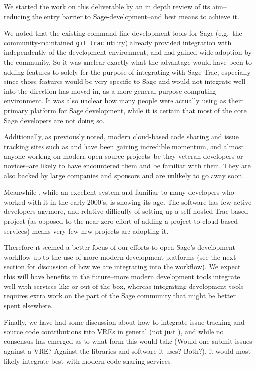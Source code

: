 We started the work on this deliverable by an in depth review of its aim--
reducing the entry barrier to Sage-development--and best means to achieve it.

We noted that the existing command-line development tools for Sage (e.g.~the
community-maintained {\tt git trac} utility) already provided integration with
\Trac independently of the development environment, and had gained wide
adoption by the community. So it was unclear exactly what the advantage would
have been to adding features to \cocalc solely for the purpose of integrating
with Sage-Trac, especially since those features would be very specific to Sage
and would not integrate well into the direction \cocalc has moved in, as a more
general-purpose computing environment.  It was also unclear how many people
were actually using \cocalc as their primary platform for Sage development,
while it is certain that most of the core Sage developers are not doing so.

Additionally, as previously noted, modern cloud-based code sharing and issue
tracking sites such as \GitHub and \GitLab have been gaining incredible
momentum, and almost anyone working on modern open source projects--be they
veteran developers or novices--are likely to have encountered them and be
familiar with them.  They are also backed by large companies and sponsors and
are unlikely to go away soon.

Meanwhile \Trac, while an excellent system and familiar to many developers who
worked with it in the early 2000's, is showing its age.  The \Trac software has
few active developers anymore, and relative difficulty of setting up a
self-hosted Trac-based project (as opposed to the near zero effort of adding a
project to cloud-based services) means very few new projects are adopting it.

Therefore it seemed a better focus of our efforts to open Sage's development
workflow up to the use of more modern development platforms (see the next
section for discussion of how we are integrating \GitLab into the workflow).
We expect this will have benefits in the future--more modern development tools
integrate well with services like \GitHub or \GitLab out-of-the-box, whereas
integrating development tools \Trac requires extra work on the part of the Sage
community that might be better spent elsewhere.

Finally, we have had some discussion about how to integrate issue tracking and
source code contributions into VREs in general (not just \cocalc), and while no
consensus has emerged as to what form this would take (Would one submit issues
against a VRE? Against the libraries and software it uses?  Both?), it would
most likely integrate best with modern code-sharing services.


